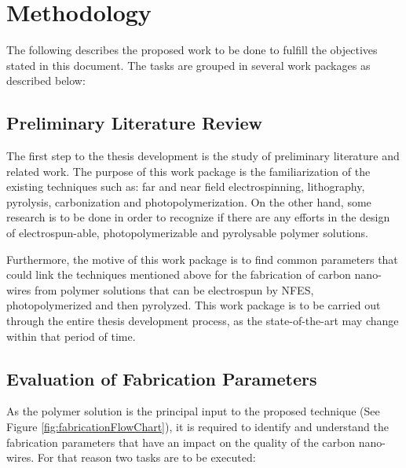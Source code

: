 
\chapter{Methodology} %

\label{Chapter:Methodology}


The following describes the proposed work to be done to fulfill the objectives stated in this document. The tasks are grouped in several work packages as described below:


\section{Preliminary Literature Review}
The first step to the thesis development is the study of preliminary literature and related work. The purpose of this work package is the familiarization of the existing techniques such as: far and near field electrospinning, lithography, pyrolysis, carbonization and photopolymerization. On the other hand, some research is to be done in order to recognize if there are any efforts in the design of electrospun-able, photopolymerizable and pyrolysable polymer solutions.

Furthermore, the motive of this work package is to find common parameters that could link the techniques mentioned above for the fabrication of carbon nano-wires from polymer solutions that can be electrospun by NFES, photopolymerized and then pyrolyzed. This work package is to be carried out through the entire thesis development process, as the state-of-the-art may change within that period of time.

\section{Evaluation of Fabrication Parameters}
As the polymer solution is the principal input to the proposed technique (See Figure \ref{fig:fabricationFlowChart}), it is required to identify and understand the fabrication parameters that have an impact on the quality of the carbon nano-wires. For that reason two tasks are to be executed:

